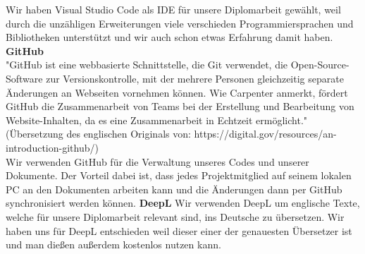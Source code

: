 \documentclass[]{article}
\begin{document}
Wir haben Visual Studio Code als IDE für unsere Diplomarbeit gewählt, weil durch die unzähligen Erweiterungen viele verschieden Programmiersprachen und Bibliotheken unterstützt und wir auch schon etwas Erfahrung damit haben. 
\vspace{4mm}\newline
\textbf{GitHub} \\
"GitHub ist eine webbasierte Schnittstelle, die Git verwendet, die Open-Source-Software zur Versionskontrolle, mit der mehrere Personen gleichzeitig separate Änderungen an Webseiten vornehmen können. Wie Carpenter anmerkt, fördert GitHub die Zusammenarbeit von Teams bei der Erstellung und Bearbeitung von Website-Inhalten, da es eine Zusammenarbeit in Echtzeit ermöglicht." (Übersetzung des englischen Originals von: https://digital.gov/resources/an-introduction-github/) \\
Wir verwenden GitHub für die Verwaltung unseres Codes und unserer Dokumente. Der Vorteil dabei ist, dass jedes Projektmitglied auf seinem lokalen PC an den Dokumenten arbeiten kann und die Änderungen dann per GitHub synchronisiert werden können.
\vspace{4mm}\newline
\textbf{DeepL}
Wir verwenden DeepL um englische Texte, welche für unsere Diplomarbeit relevant sind, ins Deutsche zu übersetzen. Wir haben uns für DeepL entschieden weil dieser einer der genauesten Übersetzer ist und man dießen außerdem kostenlos nutzen kann.
\end{document}
